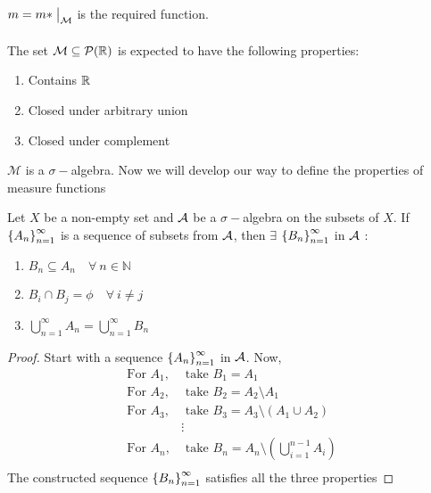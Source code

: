 \documentclass[a4paper]{book}
\begin{document}
$m = m* \bigm|_\mathcal{M}$ is the required function. \\\\
The set $\mathcal{M} \subseteq \mathcal{P}(\mathbb{R})$ is expected to have the following properties:
\begin{enumerate}
\item Contains $\mathbb{R}$
\item Closed under arbitrary union
\item Closed under complement
\end{enumerate}
$\mathcal{M}$ is a $\sigma-$algebra.
Now we will develop our way to define the properties of measure functions
\begin{theorem}
Let $X$ be a non-empty set and $\mathcal{A}$ be a $\sigma-$algebra on the subsets of $X$. If $\qty{A_n}_{n=1}^\infty$ is a sequence of subsets from $\mathcal{A}$, then $\exists$ $\qty{B_n}_{n=1}^\infty$ in $\mathcal{A}$ :
\begin{enumerate}
\item $B_n \subseteq A_n\quad \forall\ n \in \mathbb{N}$
\item $B_i \cap B_j = \phi\quad \forall\ i \neq j$
\item $\displaystyle \bigcup_{n=1}^\infty A_n= \bigcup_{n=1}^
\infty B_n$
\end{enumerate}
\begin{proof}
Start with a sequence $\qty{A_n}_{n=1}^\infty$ in $\mathcal{A}$. Now,
\begin{align*}
\text{For } A_1, &\text{ take } B_1 = A_1 \\
\text{For } A_2, &\text{ take } B_2 = A_2 \setminus A_1 \\
\text{For } A_3,	 &\text{ take } B_3 = A_3 \setminus (A_1 \cup A_2) \\
&\vdots \\
\text{For } A_n,	 & \text{ take } B_n = A_n \setminus \left(\displaystyle \bigcup_{i=1}^{n-1} A_i\right) \\
\end{align*}
The constructed sequence $\qty{B_n}_{n=1}^\infty$ satisfies all the three properties
\end{proof}
\end{theorem} 
\end{document}
